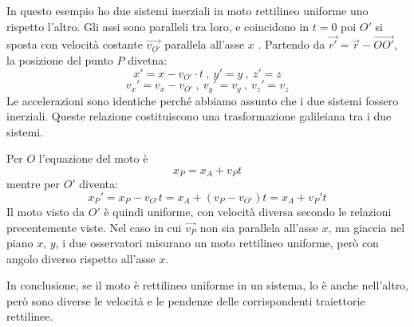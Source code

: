 \documentclass[class=book, crop=false, oneside, 12pt]{standalone}
\begin{document}
In questo esempio ho due sistemi inerziali in moto rettilineo uniforme uno rispetto l'altro.
Gli assi sono paralleli tra loro, e coincidono in \(t = 0\) poi \(O'\) si sposta con velocità costante \(\overrightarrow{v_{O'}}\) parallela all'asse \(x\) .
Partendo da \(\overrightarrow{r'} = \overrightarrow{r} - \overrightarrow{OO'}\), la posizione del punto \(P\) divetna:
\begin{equation*}
    x' = x - v_{O'} \cdot t \ , \ y' = y \ , \ z' = z
\end{equation*}
\begin{equation*}
    v_x' = v_x - v_{O'} \ , \ v_y ' = v_y \ , \ v_z ' = v_z
\end{equation*}
Le accelerazioni sono identiche perché abbiamo assunto che i due sistemi fossero inerziali.
Queste relazione costituiscono una trasformazione galileiana tra i due sistemi.

Per \(O\) l'equazione del moto è
\begin{equation*}
    x_P = x_A + v_P t
\end{equation*}
mentre per \(O'\) diventa:
\begin{equation*}
    x_P' = x_P - v_{O'} t = x_A + (v_P - v_{O'}) t = x_A + v_P' t
\end{equation*}
Il moto visto da \(O '\) è quindi uniforme, con velocità diversa secondo le relazioni precentemente viste.
Nel caso in cui \(\overrightarrow{v_P}\) non sia parallela all'asse \(x\), ma giaccia nel piano \(x\), \(y\), i due osservatori misurano un moto rettilineo uniforme, però con angolo diverso rispetto all'asse \(x\).

In conclusione, se il moto è rettilineo uniforme in un sistema, lo è anche nell'altro, però sono diverse le velocità e le pendenze delle corrispondenti traiettorie rettilinee.
\end{document}
